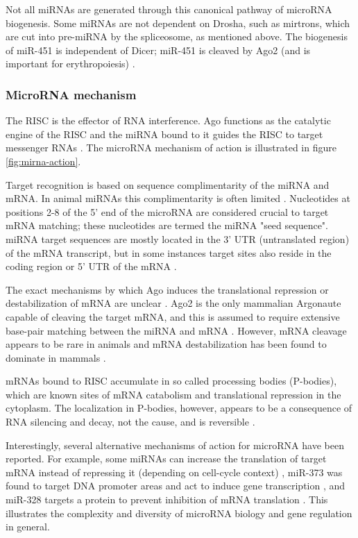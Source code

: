 Not all miRNAs are generated through this canonical pathway of microRNA
biogenesis. Some miRNAs are not dependent on Drosha, such as mirtrons, which
are cut into pre-miRNA by the spliceosome, as mentioned above. The biogenesis of
miR-451 is independent of Dicer; miR-451 is cleaved by Ago2 (and is
important for erythropoiesis) \citep{Cheloufi2010}.






\subsubsection{MicroRNA mechanism}\label{microrna-mechanism}

The RISC is the effector of RNA interference. Ago functions as the catalytic
engine of the RISC and the miRNA bound to it guides the RISC to target
messenger RNAs \citep{Filipowicz2008}. The microRNA mechanism of action is
illustrated in figure \ref{fig:mirna-action}.

Target recognition is based on sequence complimentarity of the miRNA and mRNA.
In animal miRNAs this complimentarity is often limited \citep{Ambros2004}.
Nucleotides at positions 2-8 of the 5' end of the microRNA are considered
crucial to target mRNA matching; these nucleotides are termed the miRNA "seed sequence".
miRNA target sequences are mostly located in the 3' UTR (untranslated region)
of the mRNA transcript, but in some instances target sites also reside in the
coding region or 5' UTR of the mRNA \citep{Bartel2009}.

The exact mechanisms by which Ago induces the translational repression or
destabilization of mRNA are unclear \citep{Filipowicz2008}. Ago2 is the only mammalian
Argonaute capable of cleaving the target mRNA, and this is assumed to require
extensive base-pair matching between the miRNA and mRNA \citep{Du2005}. However,
mRNA cleavage appears to be rare in animals and mRNA destabilization
has been found to dominate in mammals \citep{Guo2010}.

mRNAs bound to RISC accumulate in so called processing bodies (P-bodies),
which are known sites of mRNA catabolism and translational repression in the
cytoplasm. The localization in P-bodies, however, appears to be a consequence
of RNA silencing and decay, not the cause, and is reversible 
\citep{Eulalio2007}.

Interestingly, several alternative mechanisms of action for microRNA have been
reported. For example, some miRNAs can increase the translation of target mRNA instead of
repressing it (depending on cell-cycle context) \citep{Vasudevan2007}, miR-373
was found to target DNA promoter areas and act to induce gene transcription
\citep{Place2008}, and miR-328 targets a protein to prevent inhibition of mRNA
translation \citep{Eiring2010}. This illustrates the complexity and diversity of
microRNA biology and gene regulation in general.






